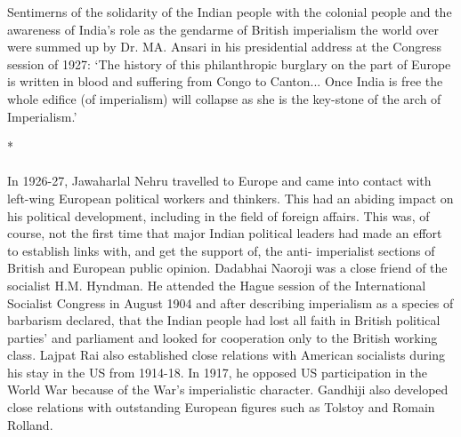 Sentimerns of the solidarity of the Indian people with the colonial people and the awareness of India's role as the gendarme of British imperialism the world over were summed up by Dr. MA. Ansari in his presidential address at the Congress session of 1927: `The history of this philanthropic burglary on the part of Europe is written in blood and suffering from Congo to Canton... Once India is free the whole edifice (of imperialism) will collapse as she is the key-stone of the arch of Imperialism.'

\begin{center}*\end{center}

\paragraph*{}


In 1926-27, Jawaharlal Nehru travelled to Europe and came into contact with left-wing European political workers and thinkers. This had an abiding impact on his political development, including in the field of foreign affairs. This was, of course, not the first time that major Indian political leaders had made an effort to establish links with, and get the support of, the anti- imperialist sections of British and European public opinion. Dadabhai Naoroji was a close friend of the socialist H.M. Hyndman. He attended the Hague session of the International Socialist Congress in August 1904 and after describing imperialism as a species of barbarism declared, that the Indian people had lost all faith in British political parties' and parliament and looked for cooperation only to the British working class. Lajpat Rai also established close relations with American socialists during his stay in the US from 1914-18. In 1917, he opposed US participation in the World War because of the War's imperialistic character. Gandhiji also developed close relations with outstanding European figures such as Tolstoy and Romain Rolland. 

